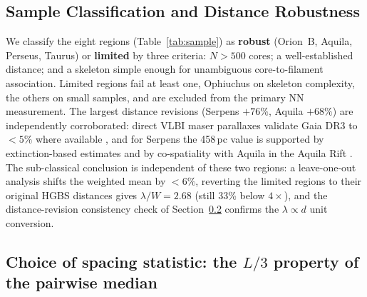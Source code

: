\documentclass[usenatbib,twoside,twocolumn]{mnras}
\begin{document}
\subsection{Sample Classification and Distance Robustness}
\label{sec:distance_uncertainties}

We classify the eight regions (Table~\ref{tab:sample}) as \textbf{robust} (Orion~B, Aquila, Perseus, Taurus) or \textbf{limited} by three criteria: $N>500$ cores; a well-established distance; and a skeleton simple enough for unambiguous core-to-filament association. Limited regions fail at least one, Ophiuchus on skeleton complexity, the others on small samples, and are excluded from the primary NN measurement. The largest distance revisions (Serpens $+76\%$, Aquila $+68\%$) are independently corroborated: direct VLBI maser parallaxes validate Gaia DR3 to $<5\%$ where available \citep{Kounkel2018,Xu2021,OrtizLeon2018,OrtizLeon2017}, and for Serpens the 458\,pc value is supported by extinction-based estimates \citep[$440$--$460$\,pc;][]{Yan2022,Green2024} and by co-spatiality with Aquila in the Aquila Rift \citep{Zucker2020}. The sub-classical conclusion is independent of these two regions: a leave-one-out analysis shifts the weighted mean by $<6\%$, reverting the limited regions to their original HGBS distances gives $\lambda/W=2.68$ (still 33\% below $4\times$), and the distance-revision consistency check of Section~\ref{sec:statistics} confirms the $\lambda\propto d$ unit conversion.


\subsection{Choice of spacing statistic: the $L/3$ property of the pairwise median}
\label{sec:statistics}
\end{document}
